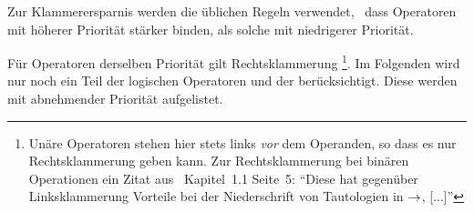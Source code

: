 Zur Klammerersparnis werden die üblichen Regeln verwendet, \textdh\ dass Operatoren mit höherer Priorität stärker binden, als solche mit niedrigerer Priorität.

Für Operatoren derselben Priorität gilt Rechtsklammerung%
\footnote{%
	Unäre Operatoren stehen hier stets links \emph{vor} dem Operanden, so dass es nur Rechtsklammerung geben kann.
	Zur Rechtsklammerung bei binären Operationen ein Zitat aus~\cite{bib:Rautenberg} Kapitel~1.1 Seite~5:
	\enquote{Diese hat gegenüber Linksklammerung Vorteile
		bei der Niederschrift von Tautologien in $\operatorname{\rightarrow}$, [...]}%
}.
Im Folgenden wird nur noch ein Teil der logischen Operatoren  und der   berücksichtigt.
Diese werden  mit abnehmender Priorität aufgelistet.

